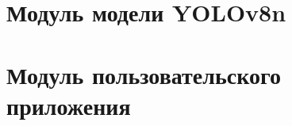 \begin{appendices}
    \chapter{Модуль модели YOLOv8n}

    \chapter{Модуль пользовательского приложения}

\end{appendices}